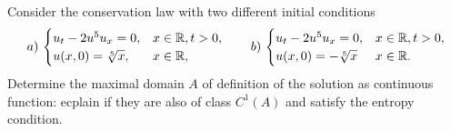 \newpage
\begin{exercise}
    Consider the conservation law with two different initial conditions
    \begin{equation*}
        a)\,\begin{cases}
            u_t - 2u^5 u_x = 0,   & x \in \mathbb{R}, t > 0, \\
            u(x,0) = \sqrt[5]{x}, & x \in \mathbb{R},
        \end{cases}
        \qquad
        b)\,\begin{cases}
            u_t - 2 u^5 u_x = 0,  & x \in \mathbb{R}, t > 0, \\
            u(x,0) = -\sqrt[5]{x} & x \in \mathbb{R}.
        \end{cases}
    \end{equation*}
    Determine the maximal domain \(A\) of definition of the solution as continuous function: ecplain if they are also of class \(C^1(A)\) and satisfy the entropy condition.
\end{exercise}

